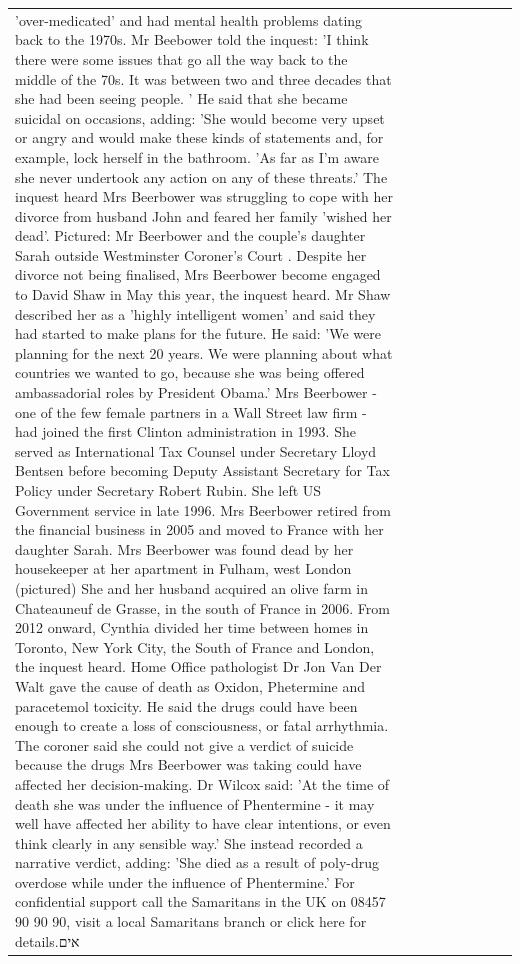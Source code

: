 \begin{table}[H]
\begin{tabular}{lllrlllll}
'over-medicated' and had mental health problems dating back to the 1970s. Mr Beebower told the inquest: 'I think there were some issues that go all the way back to the middle of the 70s. It was between two and three decades that she had been seeing people. ' He said that she became suicidal on occasions, adding: 'She would become very upset or angry and would make these kinds of statements and, for example, lock herself in the bathroom. 'As far as I'm aware she never undertook any action on any of these threats.' The inquest heard Mrs Beerbower was struggling to cope with her divorce from husband John and feared her family 'wished her dead'. Pictured: Mr Beerbower and the couple's daughter Sarah outside Westminster Coroner's Court . Despite her divorce not being finalised, Mrs Beerbower become engaged to David Shaw in May this year, the inquest heard. Mr Shaw described her as a 'highly intelligent women' and said they had started to make plans for the future. He said: 'We were planning for the next 20 years. We were planning about what countries we wanted to go, because she was being offered ambassadorial roles by President Obama.' Mrs Beerbower - one of the few female partners in a Wall Street law firm - had joined the first Clinton administration in 1993. She served as International Tax Counsel under Secretary Lloyd Bentsen before becoming Deputy Assistant Secretary for Tax Policy under Secretary Robert Rubin. She left US Government service in late 1996. Mrs Beerbower retired from the financial business in 2005 and moved to France with her daughter Sarah. Mrs Beerbower was found dead by her housekeeper at her apartment in Fulham, west London (pictured) She and her husband acquired an olive farm in Chateauneuf de Grasse, in the south of France in 2006. From 2012 onward, Cynthia divided her time between homes in Toronto, New York City, the South of France and London, the inquest heard. Home Office pathologist Dr Jon Van Der Walt gave the cause of death as Oxidon, Phetermine and paracetemol toxicity. He said the drugs could have been enough to create a loss of consciousness, or fatal arrhythmia. The coroner said she could not give a verdict of suicide because the drugs Mrs Beerbower was taking could have affected her decision-making. Dr Wilcox said: 'At the time of death she was under the influence of Phentermine - it may well have affected her ability to have clear intentions, or even think clearly in any sensible way.' She instead recorded a narrative verdict, adding: 'She died as a result of poly-drug overdose while under the influence of Phentermine.' For confidential support call the Samaritans in the UK on 08457 90 90 90, visit a local Samaritans branch or click here for details.אים \\

\end{tabular}
\end{table}
